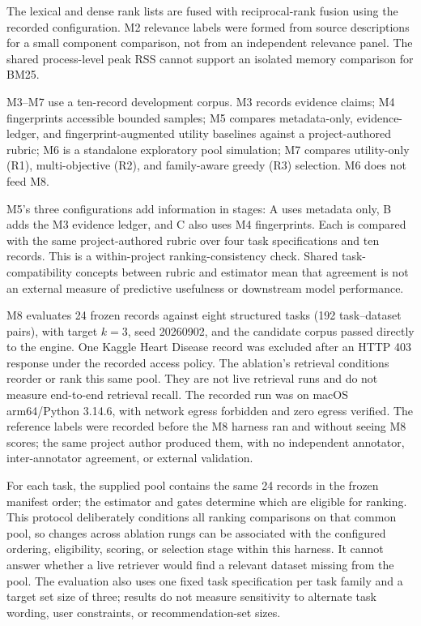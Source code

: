 \documentclass[conference]{IEEEtran}
\begin{document}
The lexical and dense rank lists are fused with reciprocal-rank fusion using the recorded configuration. M2 relevance labels were formed from source descriptions for a small component comparison, not from an independent relevance panel. The shared process-level peak RSS cannot support an isolated memory comparison for BM25.

M3--M7 use a ten-record development corpus. M3 records evidence claims; M4 fingerprints accessible bounded samples; M5 compares metadata-only, evidence-ledger, and fingerprint-augmented utility baselines against a project-authored rubric; M6 is a standalone exploratory pool simulation; M7 compares utility-only (R1), multi-objective (R2), and family-aware greedy (R3) selection. M6 does not feed M8.

M5's three configurations add information in stages: A uses metadata only, B adds the M3 evidence ledger, and C also uses M4 fingerprints. Each is compared with the same project-authored rubric over four task specifications and ten records. This is a within-project ranking-consistency check. Shared task-compatibility concepts between rubric and estimator mean that agreement is not an external measure of predictive usefulness or downstream model performance.

M8 evaluates 24 frozen records against eight structured tasks (192 task--dataset pairs), with target $k=3$, seed 20260902, and the candidate corpus passed directly to the engine. One Kaggle Heart Disease record was excluded after an HTTP 403 response under the recorded access policy. The ablation's retrieval conditions reorder or rank this same pool. They are not live retrieval runs and do not measure end-to-end retrieval recall. The recorded run was on macOS arm64/Python 3.14.6, with network egress forbidden and zero egress verified. The reference labels were recorded before the M8 harness ran and without seeing M8 scores; the same project author produced them, with no independent annotator, inter-annotator agreement, or external validation.

For each task, the supplied pool contains the same 24 records in the frozen manifest order; the estimator and gates determine which are eligible for ranking. This protocol deliberately conditions all ranking comparisons on that common pool, so changes across ablation rungs can be associated with the configured ordering, eligibility, scoring, or selection stage within this harness. It cannot answer whether a live retriever would find a relevant dataset missing from the pool. The evaluation also uses one fixed task specification per task family and a target set size of three; results do not measure sensitivity to alternate task wording, user constraints, or recommendation-set sizes.
\end{document}
